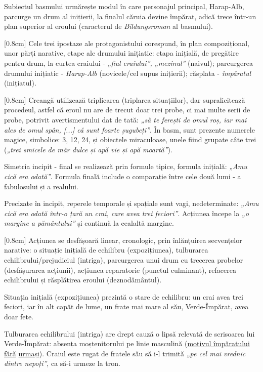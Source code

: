 \documentclass[
12pt,
a4paper
]{article}
\begin{document}
Subiectul basmului urmărește modul în care personajul principal, Harap-Alb, parcurge un drum al inițierii, la finalul căruia devine împărat, adică trece într-un plan superior al eroului (caracterul de \textit{Bildungsroman} al basmului).

[0.8cm]
Cele trei ipostaze ale protagonistului corespund, în plan compozițional, unor părți narative, etape ale drumului inițiatic: etapa inițială, de pregătire pentru drum, la curtea craiului - \textit{„fiul craiului”, „mezinul”} (naivul); parcurgerea drumului inițiatic - \textit{Harap-Alb} (novicele/cel supus inițierii); răsplata - \textit{împăratul} (inițiatul).

[0.8cm]
Creangă utilizează triplicarea (triplarea situațiilor), dar supralicitează procedeul, astfel că eroul nu are de trecut doar trei probe, ci mai multe serii de probe, potrivit avertismentului dat de tată: \textit{„să te ferești de omul roș, iar mai ales de omul spân, [...] că sunt foarte șugubeți”}. În basm, sunt prezente numerele magice, simbolice: 3, 12, 24, și obiectele miraculoase, unele fiind grupate câte trei (\textit{„trei smicele de măr dulce și apă vie și apă moartă”}).

Simetria incipit - final se realizează prin formule tipice, formula inițială: \textit{„Amu cică era odată”}. Formula finală include o comparație între cele două lumi - a fabulosului și a realului.

Precizate în incipit, reperele temporale și spațiale sunt vagi, nedeterminate: \textit{„Amu cică era odată într-o țară un crai, care avea trei feciori”}. Acțiunea începe la \textit{„o margine a pământului”} și continuă la cealaltă margine.

[0.8cm]
Acțiunea se desfășoară linear, cronologic, prin înlănțuirea secvențelor narative: o situație inițială de echilibru (expozițiunea), tulburarea echilibrului/prejudiciul (intriga), parcurgerea unui drum cu trecerea probelor (desfășurarea acțiunii), acțiunea reparatorie (punctul culminant), refacerea echilibrului și răsplătirea eroului (deznodământul).

Situația inițială (expozițiunea) prezintă o stare de echilibru: un crai avea trei feciori, iar în alt capăt de lume, un frate mai mare al său, Verde-Împărat, avea doar fete.

Tulburarea echilibrului (intriga) are drept cauză o lipsă relevată de scrisoarea lui Verde-Împărat: absența moștenitorului pe linie masculină (\underline{motivul împăratului fără} \underline{urmași}). Craiul este rugat de fratele său să i-l trimită \textit{„pe cel mai vrednic dintre nepoți”}, ca să-i urmeze la tron.
\end{document}
